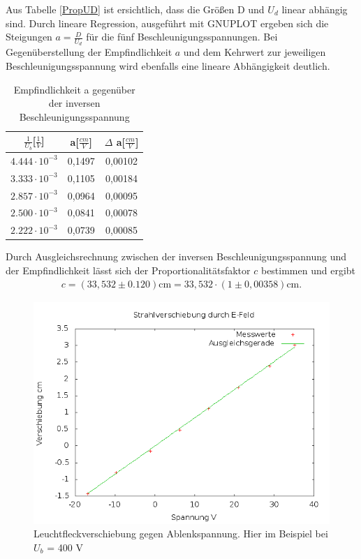 Aus Tabelle \eqref{PropUD} ist ersichtlich, dass die Größen D und $U_d$ linear abhängig sind. Durch lineare Regression, 
ausgeführt mit GNUPLOT ergeben sich die Steigungen $a = \frac{D}{U_d}$ für die fünf Beschleunigungsspannungen. Bei 
Gegenüberstellung der Empfindlichkeit $a$ und dem Kehrwert zur jeweiligen Beschleunigungsspannung wird ebenfalls eine
lineare Abhängigkeit deutlich.


\renewcommand{\arraystretch}{1.5}
\begin{table}[h]
 \begin{tabular}{c|c|c}
  $\frac{1}{U_b}$[$\frac1V$] & a[$\frac{cm}{V}$] & $\Delta$ a[$\frac{cm}{V}$] \\
  \hline
  $4.444 \cdot 10^{-3}$ & 0,1497 & 0,00102 \\
  $3.333 \cdot 10^{-3}$ & 0,1105 & 0,00184 \\
  $2.857 \cdot 10^{-3}$ & 0,0964 & 0,00095 \\
  $2.500 \cdot 10^{-3}$ & 0,0841 & 0,00078 \\
  $2.222 \cdot 10^{-3}$ & 0,0739 & 0,00085 \\
 \end{tabular}
\label{propUa}
\caption{Empfindlichkeit a gegenüber der inversen Beschleunigungsspannung}
\end{table}
\renewcommand{\arraystretch}{1}

Durch Ausgleichsrechnung zwischen der inversen Beschleunigungsspannung und der Empfindlichkeit lässt sich der 
Proportionalitätsfaktor $c$ bestimmen und ergibt 
\begin{align}
 c = (33,532 \pm 0.120) \text{cm} = 33,532 \cdot (1 \pm 0,00358) \text{cm}
 \label{c}.
\end{align}

\begin{figure}[H]
\includegraphics[width=1\textwidth] {pics/400.png}
\centering
\caption{Leuchtfleckverschiebung gegen Ablenkspannung. Hier im Beispiel bei $U_b$ = 400 V}
\end{figure}

